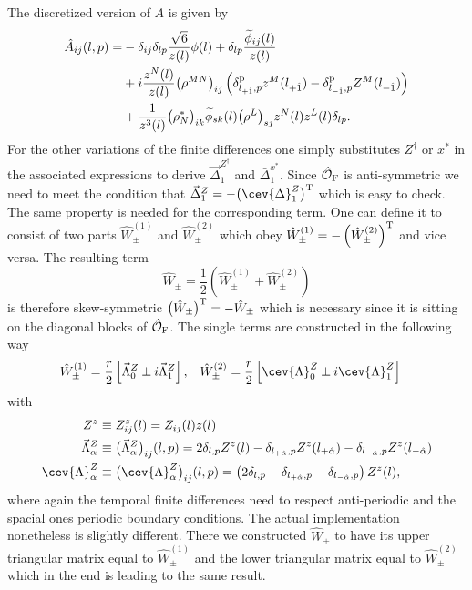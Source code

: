 %
%
The discretized version of $A$ is given by
%
%
\begin{align}
\hat{A}_{ij}(l,p) = &-\delta_{ij}\delta_{lp}\frac{\sqrt{6}}{z(l)}\phi(l) + \delta_{lp}\frac{\widetilde{\phi}_{ij}(l)}{z(l)} \notag \\
%
&+i \frac{z^{N}(l)}{z(l)} \big(\rho^{MN}\big)_{ij} \left( \delta^{\rm p}_{l_{+\hat{1}},p} z^{M}(l_{+\hat{1}}) - \delta^{\rm p}_{l_{-\hat{1}},p} Z^{M}(l_{-\hat{1}})\right) \\
%
&+ \frac{1}{z^{3}(l)} \big(\rho^{*}_{N}\big)_{ik} \widetilde{\phi}_{sk}(l) \big(\rho^{L}\big)_{sj} z^{N}(l)z^{L}(l) \delta_{lp}. \notag
\end{align}
%
%
For the other variations of the finite differences one simply substitutes $Z^{\dagger}$ or $x^{*}$ in the associated expressions to derive $\vec{\Delta}^{Z^{\dagger}}_{1}$ and $\bar{\Delta}^{x^{*}}_{1}$. Since $\hat{\mathcal{O}}_{\rm F}$ is anti-symmetric we need to meet the condition that $\vec{\Delta}^{Z}_{1}=-\big( \cev{\Delta}^{Z}_{1} \big)^{\rm T}$ which is easy to check. The same property is needed for the corresponding  term. One can define it to consist of two parts $\hat{W}^{(1)}_{\pm}$ and $\hat{W}^{(2)}_{\pm}$ which obey $\hat{W}^{(1)}_{\pm} = -\left( \hat{W}^{(2)}_{\pm} \right)^{\rm T}$ and vice versa. The resulting  term
%
%
\begin{equation}
\hat{W}_{\pm} = \frac{1}{2}\left( \hat{W}^{(1)}_{\pm} + \hat{W}^{(2)}_{\pm} \right)
\end{equation}
%
%
is therefore skew-symmetric $\big(\hat{W}_{\pm}\big)^{\rm T} = -\hat{W}_{\pm}$ which is necessary since it is sitting on the diagonal blocks of $\hat{\mathcal{O}}_{\rm F}$. The single terms are constructed in the following way
%
%
\begin{align}
\hat{W}^{(1)}_{\pm} &= \frac{r}{2} \left[ \vec{\Lambda}^{Z}_{0} \pm i \vec{\Lambda}^{Z}_{1}\right] , &
\hat{W}^{(2)}_{\pm} &= \frac{r}{2} \left[ \cev{\Lambda}^{Z}_{0} \pm i \cev{\Lambda}^{Z}_{1}\right]
\end{align}
%
%
with
%
%
\begin{align}
Z^{z} &\equiv Z^{z}_{ij}(l) = Z_{ij}(l)z(l) \notag \\
\vec{\Lambda}^{Z}_{\alpha} &\equiv \big(\vec{\Lambda}^{Z}_{\alpha}\big)_{ij}(l,p) = 2\delta_{l,p}Z^{z}(l) - \delta_{l_{+\hat{\alpha}},p}Z^{z}(l_{+\hat{\alpha}}) - \delta_{l_{-\hat{\alpha}},p}Z^{z}(l_{-\hat{\alpha}}) \\
%
%
\cev{\Lambda}^{Z}_{\alpha} &\equiv \big(\cev{\Lambda}^{Z}_{\alpha}\big)_{ij}(l,p) = \left( 2 \delta_{l,p} -\delta_{l_{+\hat{\alpha}},p} - \delta_{l_{-\hat{\alpha}},p} \right) Z^{z}(l), \notag
\end{align}
%
%
where again the temporal finite differences need to respect anti-periodic and the spacial ones periodic boundary conditions. The actual implementation nonetheless is slightly different. There we constructed $\hat{W}_{\pm}$ to have its upper triangular matrix equal to $\hat{W}_{\pm}^{(1)}$ and the lower triangular matrix equal to $\hat{W}_{\pm}^{(2)}$ which in the end is leading to the same result.
